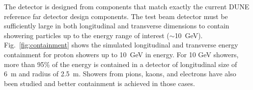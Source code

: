 

The detector is designed from components that match exactly the current DUNE reference far detector design components. 
The test beam detector must be sufficiently large in both
longitudinal and transverse dimensions to contain showering particles up to the energy range of interest ($\sim$10~GeV).
Fig.~\ref{fig:containment} shows the simulated longitudinal and transverse 
energy containment for proton showers up to 10~GeV in energy.
For 10 GeV showers, more than 95\% of the energy is contained in a detector of longitudinal size of 6~m and 
radius of 2.5~m. Showers from pions, kaons, and electrons have also been studied and better containment
is achieved in those cases. 
